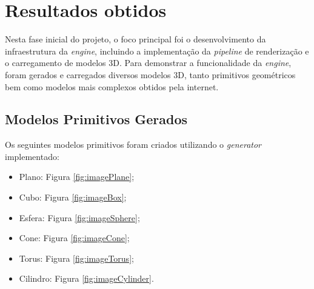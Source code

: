\documentclass[12pt, a4paper]{article}
\begin{document}
\section{Resultados obtidos}

Nesta fase inicial do projeto, o foco principal foi o desenvolvimento da infraestrutura da
\emph{engine}, incluindo a implementação da \emph{pipeline} de renderização e o carregamento de
modelos 3D. Para demonstrar a funcionalidade da \emph{engine}, foram gerados e carregados diversos
modelos 3D, tanto primitivos geométricos bem como modelos mais complexos obtidos pela internet.

\subsection{Modelos Primitivos Gerados}

Os seguintes modelos primitivos foram criados utilizando o \emph{generator} implementado:

\begin{itemize}
    \item Plano: Figura \ref{fig:imagePlane};
    \item Cubo: Figura \ref{fig:imageBox};
    \item Esfera: Figura \ref{fig:imageSphere};
    \item Cone: Figura \ref{fig:imageCone};
    \item Torus: Figura \ref{fig:imageTorus};
    \item Cilindro: Figura \ref{fig:imageCylinder}.
\end{itemize}
\end{document}
